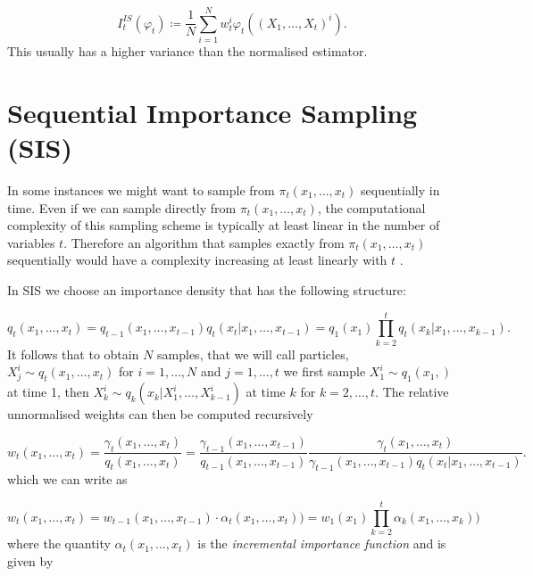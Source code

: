 \begin{equation*}
    I^{IS}_t(\varphi_t) \coloneqq \frac{1}{N} \sum_{i=1}^N w^i_t\varphi_t((X_1, \dots, X_t)^i).
\end{equation*}
This usually has a higher variance than the normalised estimator.








\section{Sequential Importance Sampling (SIS)} \label{sec:SIS}

In some instances we might want to sample from $\pi_t (x_1, \dots, x_t)$ sequentially in time. Even if we can sample directly from $\pi_t (x_1, \dots, x_t)$, the computational complexity of this sampling scheme is typically at least linear in the number of variables $t$. Therefore an algorithm that samples exactly from $\pi_t (x_1, \dots, x_t)$ sequentially would have a complexity increasing at least linearly with $t$ \cite{DoucetTutorial}.

In SIS we choose an importance density that has the following structure:

\begin{equation*}
    q_t (x_1, \dots, x_t) = q_{t-1} (x_1, \dots, x_{t-1}) q_t(x_t | x_1, \dots, x_{t-1}) = q_1 (x_1) \prod_{k=2}^t q_t(x_k | x_1, \dots, x_{k-1}).
\end{equation*}
It follows that to obtain $N$ samples, that we will call particles, $X^i_j \sim q_t (x_1, \dots, x_t)$ for $i = 1, \dots, N$ and $j = 1, \dots, t$ we first sample $X^i_1 \sim q_1 (x_1,)$ at time 1, then $X^i_k \sim q_k (x_k | X^i_1, \dots, X^i_{k-1})$ at time $k$ for $k = 2, \dots, t$. The relative unnormalised weights can then be computed recursively

\begin{equation*}
    w_t (x_1, \dots, x_t) = \frac{\gamma_t (x_1, \dots, x_t)}{q_t (x_1, \dots, x_t)} = \frac{\gamma_{t-1} (x_1, \dots, x_{t-1})}{q_{t-1} (x_1, \dots, x_{t-1})} \frac{\gamma_t (x_1, \dots, x_t)}{\gamma_{t-1} (x_1, \dots, x_{t-1}) q_t(x_t | x_1, \dots, x_{t-1})}.
\end{equation*}
which we can write as

\begin{equation*}
    w_t (x_1, \dots, x_t) = w_{t-1} (x_1, \dots, x_{t-1}) \cdot \alpha_t (x_1, \dots, x_t)) =  w_1 (x_1)\prod_{k = 2}^t \alpha_k (x_1, \dots, x_k))
\end{equation*}
where the quantity $\alpha_t (x_1, \dots, x_t)$ is the \textit{incremental importance function} and is given by

